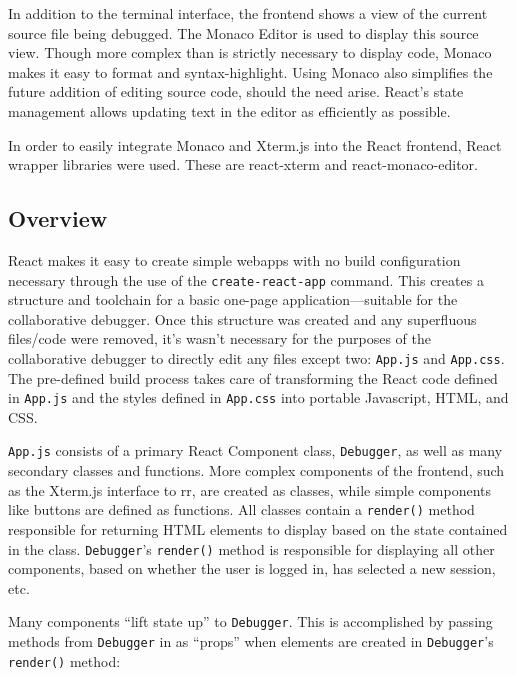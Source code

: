 \documentclass[12pt]{article}
\begin{document}
In addition to the terminal interface, the frontend shows a view of
the current source file being debugged.  The Monaco Editor
\cite{monaco} is used to display this source view.  Though more
complex than is strictly necessary to display code, Monaco makes it
easy to format and syntax-highlight.  Using Monaco also simplifies the
future addition of editing source code, should the need arise.
React's state management allows updating text in the editor as
efficiently as possible.

In order to easily integrate Monaco and Xterm.js into the React
frontend, React wrapper libraries were used.  These are
react-xterm\cite{reactxterm} and
react-monaco-editor\cite{reactmonaco}.

\subsection{Overview}

React makes it easy to create simple webapps with no build
configuration necessary through the use of the
\lstinline{create-react-app} command.  This creates a structure and
toolchain for a basic one-page application---suitable for the
collaborative debugger.  Once this structure was created and any
superfluous files/code were removed, it's wasn't necessary for the
purposes of the collaborative debugger to directly edit any files
except two: \lstinline{App.js} and \lstinline{App.css}.  The
pre-defined build process takes care of transforming the React code
defined in \lstinline{App.js} and the styles defined in
\lstinline{App.css} into portable Javascript, HTML, and CSS.
\par

\lstinline{App.js} consists of a primary React Component class,
\lstinline{Debugger}, as well as many secondary classes and functions.
More complex components of the frontend, such as the Xterm.js
interface to rr, are created as classes, while simple components like
buttons are defined as functions.  All classes contain a
\lstinline{render()} method responsible for returning HTML elements to
display based on the state contained in the class.
\lstinline{Debugger}'s \lstinline{render()} method is responsible for
displaying all other components, based on whether the user is logged
in, has selected a new session, etc.
\par

Many components ``lift state up'' to \lstinline{Debugger}.  This is
accomplished by passing methods from \lstinline{Debugger} in as
``props'' when elements are created in \lstinline{Debugger}'s
\lstinline{render()} method:
\end{document}
